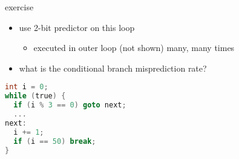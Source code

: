 \begin{frame}[fragile,label=2BmispredEx]{exercise}
\begin{itemize}
\item use 2-bit predictor on this loop
    \begin{itemize}
    \item executed in outer loop (not shown) many, many times
    \end{itemize}
\item what is the conditional branch misprediction rate?
\end{itemize}
\begin{lstlisting}[language=C,style=small]
int i = 0;
while (true) {
  if (i % 3 == 0) goto next;
  ...
next:
  i += 1;
  if (i == 50) break;
}
\end{lstlisting}
\end{frame}


